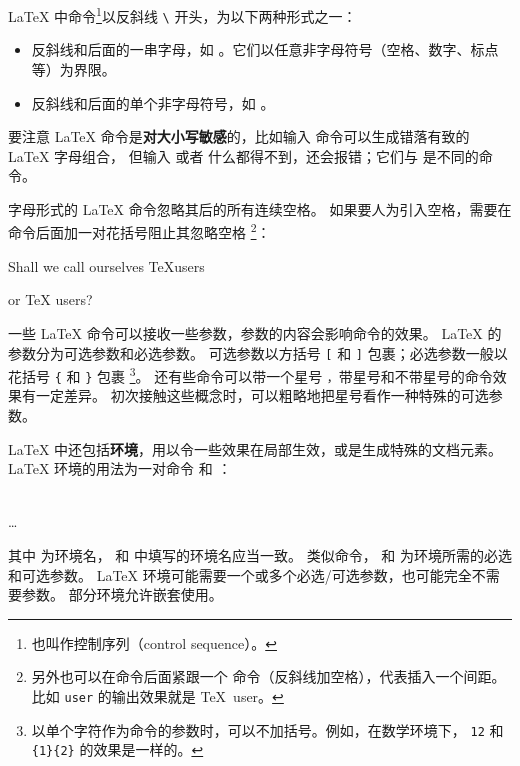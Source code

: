 \LaTeX{} 中命令\footnote{也叫作控制序列（control sequence）。}以反斜线 \texttt{\textbackslash} 开头，为以下两种形式之一：
\begin{itemize}
  \item 反斜线和后面的一串字母，如 。它们以任意非字母符号（空格、数字、标点等）为界限。
  \item 反斜线和后面的单个非字母符号，如 \cmd{\$}。
\end{itemize}

要注意 \LaTeX{} 命令是\textbf{对大小写敏感}的，比如输入  命令可以生成错落有致的 \LaTeX{} 字母组合，
但输入  或者  什么都得不到，还会报错；它们与  是不同的命令。

字母形式的 \LaTeX{} 命令忽略其后的所有连续空格。
如果要人为引入空格，需要在命令后面加一对花括号阻止其忽略空格%
\footnote{另外也可以在命令后面紧跟一个 \cmd{\textvisiblespace} 命令（反斜线加空格），代表插入一个间距。
比如 \cmd{\textvisiblespace}\texttt{user} 的输出效果就是 \TeX\ user。}：
\begin{example}
Shall we call ourselves
\TeX users

or \TeX{} users?
\end{example}

一些 \LaTeX{} 命令可以接收一些参数，参数的内容会影响命令的效果。
\LaTeX{} 的参数分为可选参数和必选参数。
可选参数以方括号 \texttt[ 和 \texttt] 包裹；必选参数一般以花括号 \texttt\{ 和 \texttt\} 包裹%
\footnote{以单个字符作为命令的参数时，可以不加括号。例如，在数学环境下，
\texttt{12} 和 \texttt{\{1\}\{2\}} 的效果是一样的。}。
还有些命令可以带一个星号 \texttt*，带星号和不带星号的命令效果有一定差异。
初次接触这些概念时，可以粗略地把星号看作一种特殊的可选参数。

\LaTeX{} 中还包括\textbf{环境}，用以令一些效果在局部生效，或是生成特殊的文档元素。
\LaTeX{} 环境的用法为一对命令  和 ：
\begin{command}
 \\
\ldots \\
\end{command}

其中  为环境名， 和  中填写的环境名应当一致。
类似命令， 和  为环境所需的必选和可选参数。
\LaTeX{} 环境可能需要一个或多个必选/可选参数，也可能完全不需要参数。
部分环境允许嵌套使用。

